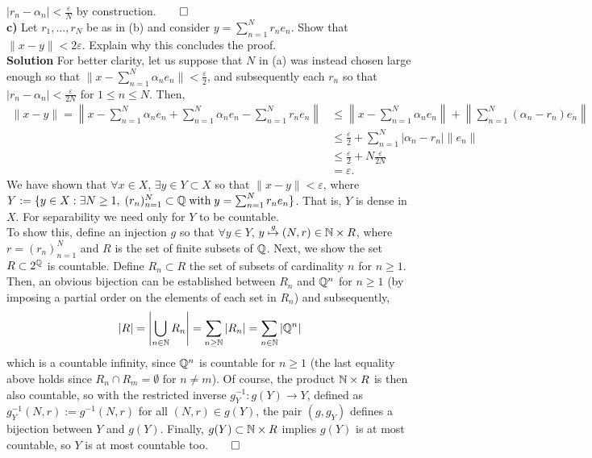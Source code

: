 \documentclass[10pt]{article}
\newcommand{\1}[1]{\mathbbm{1}_{#1}} \newcommand{\mc}[1]{\mathcal{#1}}
\begin{document}
    $|r_n-\alpha_n|<\tfrac{\varepsilon}{N}$ by
    construction.\hfill{$\qed$}\\[5pt]
    {\bf c)} Let $r_1,\dots, r_N$ be as in (b) and consider $y=\sum_{n=1}^N
    r_ne_n$. Show that $\|x-y\|<2\varepsilon$. Explain why this concludes the
    proof.\\[5pt]
    {\bf Solution} For better clarity, let us suppose that $N$ in (a) was
    instead chosen large enough so that
    $\|x-\sum_{n=1}^N\alpha_ne_n\|<\tfrac{\varepsilon}{2}$, and subsequently
    each $r_n$ so that $|r_n-\alpha_n|<\tfrac{\varepsilon}{2N}$ for $1\leq n\leq
    N$. Then,
    \begin{align*}
        \|x-y\|=\left\|x-\sum_{n=1}^N\alpha_ne_n+\sum_{n=1}^N\alpha_ne_n-\sum_{n=1}^Nr_ne_n\right\|&\leq \left\|x-\sum_{n=1}^N\alpha_ne_n\right\|+\left\|\sum_{n=1}^N(\alpha_n-r_n)e_n\right\|\\
        &\leq \tfrac{\varepsilon}{2}+\sum_{n=1}^N|\alpha_n-r_n|\|e_n\|\\
        &\leq\tfrac{\varepsilon}{2}+N\tfrac{\varepsilon}{2N}\\
        &=\varepsilon.
    \end{align*}
    We have shown that $\forall x\in X$, $\exists y\in Y\subset X$ so that
    $\|x-y\|<\varepsilon$, where $Y:=\{y\in X:\exists N\geq
    1,\;(r_n)_{n=1}^N\subset\mathbb{Q}\;\text{with}\;y=\sum_{n=1}^Nr_ne_n\}$. That
    is, $Y$ is dense in $X$. For separability we need only for $Y$ to be
    countable.\\[5pt]
    To show this, define an injection $g$ so that $\forall y\in Y$,
    $y\overset{g}{\mapsto} (N,r)\in\mathbb{N}\times R$, where $r=(r_n)_{n=1}^N$ and
    $R$ is the set of finite subsets of $\mathbb{Q}$. Next, we show the set
    $R\subset 2^{\mathbb{Q}}$ is countable. Define $R_n\subset R$ the set of subsets
    of cardinality $n$ for $n\geq 1$. Then, an obvious bijection can be
    established between $R_n$ and $\mathbb{Q}^n$ for $n\geq 1$ (by imposing a
    partial order on the elements of each set in $R_n$) and subsequently,
    \[|R|=\left|\bigcup_{n\in\mathbb{N}}R_n\right|=\sum_{n\geq\mathbb{N}}|R_n|=\sum_{n\in\mathbb{N}}|\mathbb{Q}^n|\]
    which is a countable infinity, since $\mathbb{Q}^n$ is countable for $n\geq 1$
    (the last equality above holds since $R_n\cap R_m=\emptyset$ for $n\neq m$).
    Of course, the product $\mathbb{N}\times R$ is then also countable, so with the
    restricted inverse $g_Y^{-1}:g(Y)\rightarrow Y$, defined as
    $g_Y^{-1}(N,r):=g^{-1}(N,r)$ for all $(N,r)\in g(Y)$, the pair $(g,g_Y)$
    defines a bijection between $Y$ and $g(Y)$. Finally, $g(Y)\subset
    \mathbb{N}\times R$ implies $g(Y)$ is at most countable, so $Y$ is at most
    countable too.\hfill{$\qed$}
\end{document}
